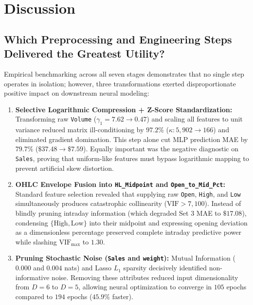 \documentclass[conference]{IEEEtran}
\begin{document}
\section{Discussion}
\label{sec:discussion}

\subsection{Which Preprocessing and Engineering Steps Delivered the Greatest Utility?}
Empirical benchmarking across all seven stages demonstrates that no single step operates in isolation; however, three transformations exerted disproportionate positive impact on downstream neural modeling:
\begin{enumerate}
    \item \textbf{Selective Logarithmic Compression + Z-Score Standardization:} Transforming raw \texttt{Volume} ($\gamma_1 = 7.62 \to 0.47$) and scaling all features to unit variance reduced matrix ill-conditioning by $97.2\%$ ($\kappa: 5{,}902 \to 166$) and eliminated gradient domination. This step alone cut MLP prediction MAE by $79.7\%$ ($\$37.48 \to \$7.59$). Equally important was the negative diagnostic on \texttt{Sales}, proving that uniform-like features must bypass logarithmic mapping to prevent artificial skew distortion.
    \item \textbf{OHLC Envelope Fusion into \texttt{HL\_Midpoint} and \texttt{Open\_to\_Mid\_Pct}:} Standard feature selection revealed that supplying raw \texttt{Open}, \texttt{High}, and \texttt{Low} simultaneously produces catastrophic collinearity ($\text{VIF} > 7{,}100$). Instead of blindly pruning intraday information (which degraded Set 3 MAE to $\$17.08$), condensing $\{\text{High}, \text{Low}\}$ into their midpoint and expressing opening deviation as a dimensionless percentage preserved complete intraday predictive power while slashing $\text{VIF}_{\max}$ to $1.30$.
    \item \textbf{Pruning Stochastic Noise (\texttt{Sales} and \texttt{weight}):} Mutual Information ($0.000$ and $0.004$ nats) and Lasso $L_1$ sparsity decisively identified non-informative noise. Removing these attributes reduced input dimensionality from $D = 6$ to $D = 5$, allowing neural optimization to converge in $105$ epochs compared to $194$ epochs ($45.9\%$ faster).
\end{enumerate}
\end{document}
